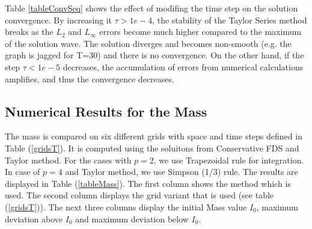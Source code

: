 \documentclass[%
 aip,
cp,  
 amsmath,amssymb,
 reprint,
]{iopconfser}
\newcommand{\rf}[1]{(\ref{#1})}
\begin{document}
Table \ref{tableConvSeq} shows the effect of modifing the time step on the solution convergence. By increasing it $\tau>1e-4$, the stability of the Taylor Series method breaks as the $L_2$ and $L_\infty$ errors become much higher compared to the maximum of the solution wave. The solution diverges and becomes non-smooth (e.g. the graph is jagged for T=30) and there is no convergence. On the other hand, if the step $\tau<1e-5$ decreases, the accumulation of errors from numerical calculations amplifies, and thus the convergence decreases.

\subsection{Numerical Results for the Mass}
The mass is compared on six different grids with space and time steps defined in Table \rf{gridsT}. It is computed using the soluitons from Conservative FDS and Taylor method. For the cases with 
$p=2$, we use Trapezoidal rule for integration. In case of $p=4$ and Taylor method, we use Simpson (1/3) rule. The results are displayed in Table \rf{tableMass}. The first column shows the method which is used. The second column displays the grid variant that is used (see table \rf{gridsT}). The next three columns display the initial Mass value $I_0$, maximum deviation above $I_0$ and maximum deviation below $I_0$.
\end{document}
